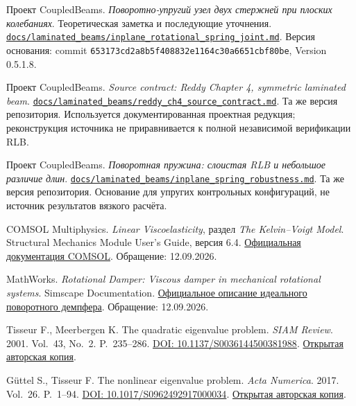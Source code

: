 \documentclass[11pt,a4paper]{article}
\numberwithin{equation}{section}
\newcommand{\repo}[2]{\href{https://github.com/gimmiloot/CoupledBeams/blob/653173cd2a8b5f408832e1164c30a6651cbf80be/#1}{#2}}
\begin{document}
\begin{thebibliography}{9}
Проект CoupledBeams.
\emph{Поворотно-упругий узел двух стержней при плоских колебаниях}.
Теоретическая заметка и последующие уточнения.
\repo{docs/laminated_beams/inplane_rotational_spring_joint.md}{\nolinkurl{docs/laminated_beams/inplane_rotational_spring_joint.md}}.
Версия основания: commit \texttt{653173cd2a8b5f408832e1164c30a6651cbf80be},
Version 0.5.1.8.

Проект CoupledBeams.
\emph{Source contract: Reddy Chapter 4, symmetric laminated beam}.
\repo{docs/laminated_beams/reddy_ch4_source_contract.md}{\nolinkurl{docs/laminated_beams/reddy_ch4_source_contract.md}}.
Та же версия репозитория. Используется документированная проектная
редукция; реконструкция источника не приравнивается к полной
независимой верификации RLB.

Проект CoupledBeams.
\emph{Поворотная пружина: слоистая RLB и небольшое различие длин}.
\repo{docs/laminated_beams/inplane_spring_robustness.md}{\nolinkurl{docs/laminated_beams/inplane_spring_robustness.md}}.
Та же версия репозитория. Основание для упругих контрольных конфигураций,
не источник результатов вязкого расчёта.

COMSOL Multiphysics.
\emph{Linear Viscoelasticity}, раздел \emph{The Kelvin--Voigt Model}.
Structural Mechanics Module User's Guide, версия 6.4.
\href{https://doc.comsol.com/6.4/doc/com.comsol.help.sme/sme_ug_theory.06.029.html}{Официальная документация COMSOL}.
Обращение: 12.09.2026.

MathWorks. \emph{Rotational Damper: Viscous damper in mechanical rotational systems}.
Simscape Documentation.
\href{https://www.mathworks.com/help/simscape/ref/rotationaldamper.html}{Официальное описание идеального поворотного демпфера}.
Обращение: 12.09.2026.

Tisseur F., Meerbergen K.
The quadratic eigenvalue problem.
\emph{SIAM Review}. 2001. Vol.~43, No.~2. P.~235--286.
\href{https://doi.org/10.1137/S0036144500381988}{DOI: 10.1137/S0036144500381988}.
\href{https://eprints.maths.manchester.ac.uk/466/1/38198.pdf}{Открытая авторская копия}.

Güttel S., Tisseur F.
The nonlinear eigenvalue problem.
\emph{Acta Numerica}. 2017. Vol.~26. P.~1--94.
\href{https://doi.org/10.1017/S0962492917000034}{DOI: 10.1017/S0962492917000034}.
\href{https://eprints.maths.manchester.ac.uk/2538/1/main.pdf}{Открытая авторская копия}.
\end{thebibliography}
\endgroup
\end{document}
